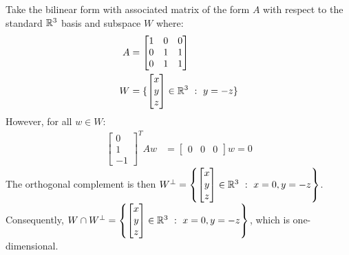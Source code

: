 \documentclass{article}
\begin{document}
\problem
Take the bilinear form with associated matrix of the form $A$ with respect to the standard $\mathbb{R}^3$ basis and subspace $W$ where:
\begin{equation}
    \begin{split}
        A & = \begin{bmatrix}
            1 & 0 & 0 \\ 0 & 1 & 1 \\ 0 & 1 & 1
        \end{bmatrix} \\
        W & = \{\begin{bmatrix}
            x \\ y \\ z
        \end{bmatrix} \in \mathbb{R}^3 \ : \ y = -z\}
    \end{split}
\end{equation}
However, for all $w \in W$:
\begin{equation}
    \begin{split}
        \begin{bmatrix}
            0 \\ 1 \\ -1
        \end{bmatrix}^TAw & = \begin{bmatrix}
            0 & 0 & 0
        \end{bmatrix}w = 0
    \end{split}
\end{equation}
The orthogonal complement is then $W^{\perp} = \left\{ \begin{bmatrix} x \\ y \\ z \end{bmatrix} \in \mathbb{R}^3 \ : \ x = 0, y = -z\right\}$. Consequently, $W \cap W^{\perp} = \left\{ \begin{bmatrix} x \\ y \\ z \end{bmatrix} \in \R^3 \ : \ x = 0, y = -z \right\}$, which is one-dimensional.
\end{document}
